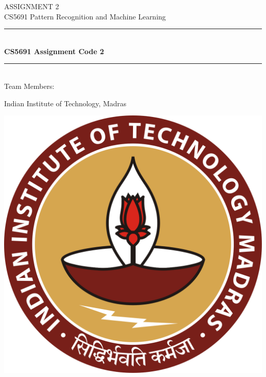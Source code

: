 \documentclass[11pt,a4paper]{article}
\begin{document}
    \begin{titlepage} 
        \begin{center}
        \large{ASSIGNMENT 2}\\
        \vspace{2em}
        \large {CS5691 Pattern Recognition and Machine Learning}
        \vspace{3em}
        
        \rule{0.9\linewidth}{0.5mm} \\[0.4cm]
        {\Large{\bfseries{CS5691 Assignment Code 2}}} \\
        \rule{0.9\linewidth}{0.5mm} \\[3 em]    
        
        Team Members: \\
        \vspace{0.5em}
        

        \vspace{1em}

        Indian Institute of Technology, Madras\\    
        
        \vspace{5em}    
        
            \includegraphics[scale = 0.09]{images/iitmlogo.png}
        \end{center}
    \end{titlepage}
\end{document}

